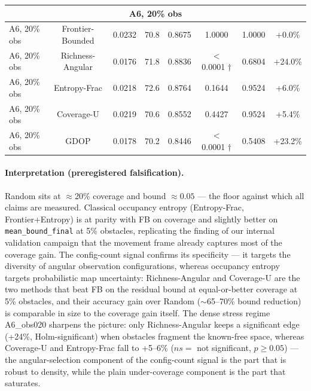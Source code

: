 \documentclass[journal]{IEEEtran}
\newcommand{\CU}{Coverage-U}
\begin{document}
\begin{table}[t]
\begin{tabular}{l c c c c c c c}
\multicolumn{8}{c}{\textbf{A6, 20\% obs}} \\
\midrule
A6, 20\% obs & Frontier-Bounded & 0.0232 & 70.8 & 0.8675 & 1.0000 & 1.0000 & +0.0\% \\
A6, 20\% obs & Richness-Angular & 0.0176 & 71.8 & 0.8836 & $<$0.0001 $\dagger$ & 0.6804 & +24.0\% \\
A6, 20\% obs & Entropy-Frac & 0.0218 & 72.6 & 0.8764 & 0.1644 & 0.9524 & +6.0\% \\
A6, 20\% obs & Coverage-U & 0.0219 & 70.6 & 0.8552 & 0.4427 & 0.9524 & +5.4\% \\
A6, 20\% obs & GDOP & 0.0178 & 70.2 & 0.8446 & $<$0.0001 $\dagger$ & 0.5408 & +23.2\% \\
\bottomrule
\end{tabular}
\end{table}


\paragraph{Interpretation (preregistered falsification).}
Random sits at $\approx$20\% coverage and bound $\approx 0.05$ --- the floor
against which all claims are measured. Classical occupancy entropy
(Entropy-Frac, Frontier+Entropy) is at parity with FB on coverage and slightly
better on \texttt{mean\_bound\_final} at 5\% obstacles, replicating the finding
of our internal validation campaign that the movement frame already captures
most of the coverage gain. The config-count signal confirms its specificity ---
it targets the diversity of angular observation configurations, whereas
occupancy entropy targets probabilistic map uncertainty: Richness-Angular and
\CU{} are the two methods that beat FB on the residual bound at equal-or-better
coverage at 5\% obstacles, and their accuracy gain over Random ($\sim$65--70\%
bound reduction) is comparable in size to the coverage gain itself. The dense
stress regime A6\_obs020 sharpens the picture: only Richness-Angular keeps a
significant edge (+24\%, Holm-significant) when obstacles fragment the
known-free space, whereas \CU{} and Entropy-Frac fall to +5--6\% ($ns =$ not
significant, $p \geq 0.05$) --- the angular-selection component of the
config-count signal is the part that is robust to density, while the plain
under-coverage component is the part that saturates.
\end{document}

